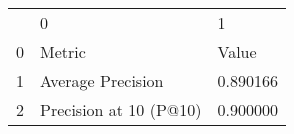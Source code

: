 \begin{tabular}{lll}
 & 0 & 1 \\
0 & Metric & Value \\
1 & Average Precision & 0.890166 \\
2 & Precision at 10 (P@10) & 0.900000 \\
\end{tabular}
